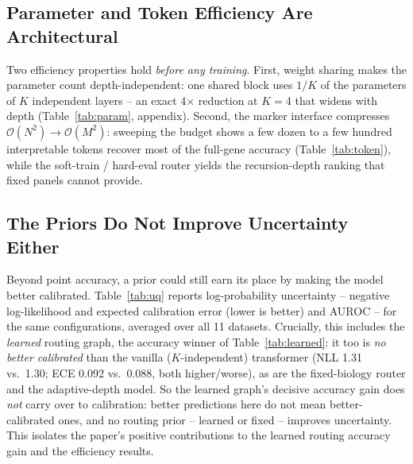 \documentclass[letterpaper]{article}
\begin{document}
\subsection{Parameter and Token Efficiency Are Architectural}
\label{sec:params}
Two efficiency properties hold \emph{before any training}. First, weight sharing makes the
parameter count depth-independent: one shared block uses $1/K$ of the parameters of $K$
independent layers -- an exact 4$\times$ reduction at $K{=}$4 that
widens with depth (Table~\ref{tab:param}, appendix). Second, the marker interface compresses
$\mathcal{O}(N^2)\!\to\!\mathcal{O}(M^2)$: sweeping the budget shows a few dozen to a few
hundred interpretable tokens recover most of the full-gene accuracy (Table~\ref{tab:token}),
while the soft-train / hard-eval router yields the recursion-depth ranking that
fixed panels cannot provide.



\subsection{The Priors Do Not Improve Uncertainty Either}
Beyond point accuracy, a prior could still earn its place by making the model better
calibrated. Table~\ref{tab:uq} reports log-probability uncertainty -- negative
log-likelihood and expected calibration error (lower is better) and AUROC -- for the same
configurations, averaged over all 11 datasets. Crucially, this includes the
\emph{learned} routing graph, the accuracy winner of Table~\ref{tab:learned}: it too is
\emph{no better calibrated} than the vanilla ($K$-independent) transformer (NLL
1.31 vs.\ 1.30; ECE 0.092 vs.\ 0.088, both
higher/worse), as are the fixed-biology router and the adaptive-depth model. So the
learned graph's decisive accuracy gain does \emph{not} carry over to calibration: better
predictions here do not mean better-calibrated ones, and no routing prior -- learned or
fixed -- improves uncertainty. This isolates the paper's positive contributions to the
learned routing accuracy gain and the efficiency results.
\end{document}
